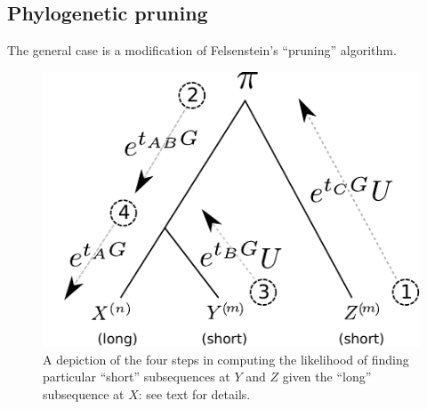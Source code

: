 \documentclass{article}
\theoremstyle{plain}
\theoremstyle{definition}
\begin{document}
\subsection{Phylogenetic pruning}

The general case is a modification of Felsenstein's ``pruning'' algorithm\citep{felsenstein1981evolutionary}.

\begin{figure}
    \begin{center}
    \includegraphics{pruning-schematic}
    \end{center}
    \caption{
        A depiction of the four steps in computing the likelihood
        of finding particular ``short'' subsequences at $Y$ and $Z$
        given the ``long'' subsequence at $X$: see text for details.
        \label{fig:pruning}
    }
\end{figure}
\end{document}
